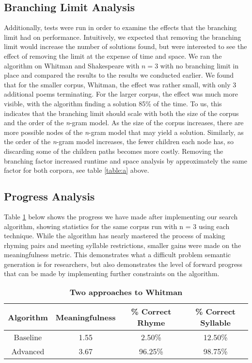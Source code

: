 \documentclass[10pt,twocolumn]{article}
\begin{document}
\subsection{Branching Limit Analysis}
Additionally, tests were run in order to examine the effects that the branching limit had on performance. Intuitively, we expected that removing the branching limit would increase the number of solutions found, but were interested to see the effect of removing the limit at the expense of time and space. We ran the algorithm on Whitman and Shakespeare with $n=3$ with no branching limit in place and compared the results to the results we conducted earlier. We found that for the smaller corpus, Whitman, the effect was rather small, with only 3 additional poems terminating. For the larger corpus, the effect was much more visible, with the algorithm finding a solution 85\% of the time. To us, this indicates that the branching limit should scale with both the size of the corpus and the order of the \emph{n}-gram model. As the size of the corpus increases, there are more possible nodes of the \emph{n}-gram model that may yield a solution. Similarly, as the order of the \emph{n}-gram model increases, the fewer children each node has, so discarding some of the children paths becomes more costly. Removing the branching factor increased runtime and space analysis by approximately the same factor for both corpora, see table \ref{table:a} above.

\subsection{Progress Analysis}

Table \ref{table:b} below shows the progress we have made after implementing our search algorithm, showing statistics for the same corpus run with n = 3 using each technique. While the algorithm has nearly mastered the process of making rhyming pairs and meeting syllable restrictions, smaller gains were made on the meaningfulness metric. This demonstrates what a difficult problem semantic generation is for researchers, but also demonstrates the level of forward progress that can be made by implementing further constraints on the algorithm. 

\begin{table}[h]
\caption{\textbf{Two approaches to Whitman}}
\label{table:b}
\begin{adjustbox}{width=\linewidth}
\begin{tabular}{c | c | c | c}
Algorithm & Meaningfulness & \% Correct Rhyme & \% Correct Syllable \\ \hline
Baseline & 1.55 & 2.50\% & 12.50\% \\
Advanced & 3.67 & 96.25\% & 98.75\% \\ \hline
\end{tabular}
\end{adjustbox}
\end{table}
\end{document}
